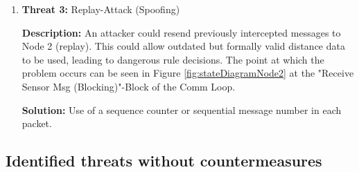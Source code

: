 \begin{enumerate}
        \paragraph{} 
		\item \textbf{Threat 3:} Replay-Attack (Spoofing)
            
            \textbf{Description:} An attacker could resend previously intercepted messages to Node 2 (replay). This could allow outdated but formally valid distance data to be used, leading to dangerous rule decisions. The point at which the problem occurs can be seen in Figure \ref{fig:stateDiagramNode2} at the "Receive Sensor Msg (Blocking)"-Block of the Comm Loop.
            
            \textbf{Solution:} Use of a sequence counter or sequential message number in each packet.
        
        \paragraph{} 
	\end{enumerate}
	
\subsection{Identified threats without countermeasures}

